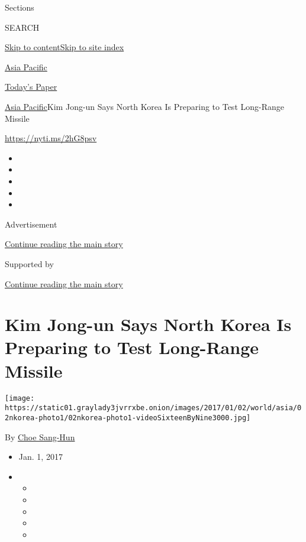Sections

SEARCH

\protect\hyperlink{site-content}{Skip to
content}\protect\hyperlink{site-index}{Skip to site index}

\href{https://www.nytimes3xbfgragh.onion/section/world/asia}{Asia
Pacific}

\href{https://myaccount.nytimes3xbfgragh.onion/auth/login?response_type=cookie\&client_id=vi}{}

\href{https://www.nytimes3xbfgragh.onion/section/todayspaper}{Today's
Paper}

\href{/section/world/asia}{Asia Pacific}\textbar{}Kim Jong-un Says North
Korea Is Preparing to Test Long-Range Missile

\url{https://nyti.ms/2hG8psv}

\begin{itemize}
\item
\item
\item
\item
\item
\end{itemize}

Advertisement

\protect\hyperlink{after-top}{Continue reading the main story}

Supported by

\protect\hyperlink{after-sponsor}{Continue reading the main story}

\hypertarget{kim-jong-un-says-north-korea-is-preparing-to-test-long-range-missile}{%
\section{Kim Jong-un Says North Korea Is Preparing to Test Long-Range
Missile}\label{kim-jong-un-says-north-korea-is-preparing-to-test-long-range-missile}}

\texttt{[image: https://static01.graylady3jvrrxbe.onion/images/2017/01/02/world/asia/02nkorea-photo1/02nkorea-photo1-videoSixteenByNine3000.jpg]}

By \href{http://www.nytimes3xbfgragh.onion/by/choe-sang-hun}{Choe
Sang-Hun}

\begin{itemize}
\item
  Jan. 1, 2017
\item
  \begin{itemize}
  \item
  \item
  \item
  \item
  \item
  \end{itemize}
\end{itemize}

